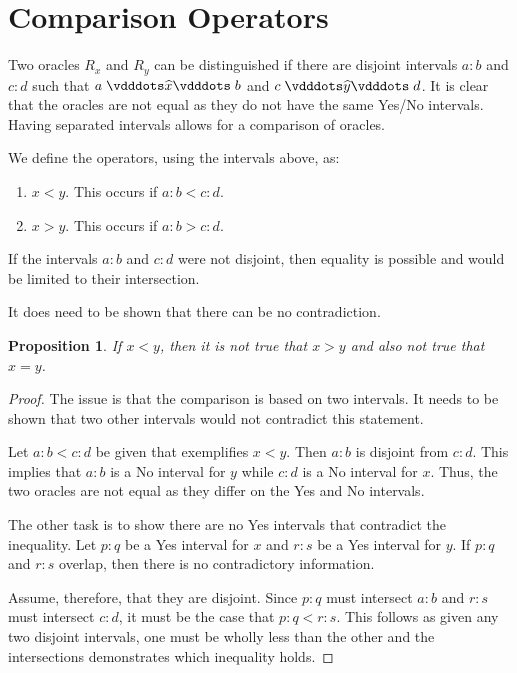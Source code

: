 \documentclass[12pt]{article}
\newtheorem{proposition}{Proposition}[section]
\begin{document}
\section{Comparison Operators}

Two oracles $R_x$ and $R_y$ can be distinguished if there are disjoint intervals $a:b$ and $c:d$ such that $a \xora b$ and $c \xora[y] d$. It is clear that the oracles are not equal as they do not have the same Yes/No intervals. Having separated intervals allows for a comparison of oracles. 

We define the operators, using the intervals above, as:
\begin{enumerate}
    \item $x < y$. This occurs if $a:b<c:d$.
    \item $x > y$. This occurs if $a:b > c:d$.
\end{enumerate}

If the intervals $a:b$ and $c:d$ were not disjoint, then equality is possible and would be limited to their intersection. 

It does need to be shown that there can be no contradiction. 

\begin{proposition}
    If $x < y$, then it is not true that $x > y$ and also not true that $x = y$.
\end{proposition}

\begin{proof}
    The issue is that the comparison is based on two intervals. It needs to be shown that two other intervals would not contradict this statement. 

    Let $a:b < c:d$ be given that exemplifies $x<y$. Then $a:b$ is disjoint from $c:d$. This implies that $a:b$ is a No interval for $y$ while $c:d$ is a No interval for $x$. Thus, the two oracles are not equal as they differ on the Yes and No intervals. 

    The other task is to show there are no Yes intervals that contradict the inequality. Let $p:q$ be a Yes interval for $x$ and $r:s$ be a Yes interval for $y$. If $p:q$ and $r:s$ overlap, then there is no contradictory information. 

    Assume, therefore, that they are disjoint. Since $p:q$ must intersect $a:b$ and $r:s$ must intersect $c:d$, it must be the case that $p:q < r:s$. This follows as given any two disjoint intervals, one must be wholly less than the other and the intersections demonstrates which inequality holds. 

\end{proof}
\end{document}
